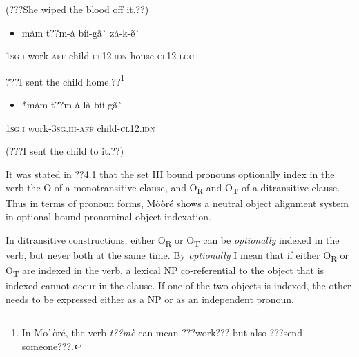 \documentclass[output=paper]{langsci/langscibook}
\begin{document}
{{\begin{styleTranslation}
(???She wiped the blood off it.??)
\end{styleTranslation}

\begin{itemize}
\item \begin{styleNumberedEX}
\label{bkm:Ref424201799}m\`{a}m    t??m-\`{a}    b\'{i}\'{i}-g\~{a}\`{ }      z\'{a}-k-\~{e}\`{ }
\end{styleNumberedEX}\end{itemize}
\begin{styleGloss}
\textsc{1sg.i  }  work-\textsc{aff}  child-\textsc{cl12.idn}  house-\textsc{cl12-loc}
\end{styleGloss}

\begin{styleTranslation}
???I sent the child home.??\footnote{ In Mo\`{ }\`{o}r\'{e}, the verb \textit{t??m\`{e}} can mean ???work??? but also ???send someone???. }
\end{styleTranslation}

\begin{itemize}
\item \begin{styleNumberedEX}
\label{bkm:Ref424201839}*m\`{a}m  t??m-\`{a}-l\`{a}      b\'{i}\'{i}-g\~{a}\`{ }
\end{styleNumberedEX}\end{itemize}
\begin{styleGloss}
\textsc{1sg.i  }  work-\textsc{3sg.iii-aff}    child-\textsc{cl12.idn}
\end{styleGloss}

\begin{styleTranslation}
(???I sent the child to it.??)
\end{styleTranslation}

It was stated in ??4.1 that the set III bound pronouns optionally index in the verb the O of a monotransitive clause, and O\textsubscript{R} and O\textsubscript{T }of a ditransitive clause. Thus in terms of pronoun forms, M\`{o}\`{o}r\'{e} shows a neutral object alignment system in optional bound pronominal object indexation.  

In ditransitive constructions, either O\textsubscript{R} or O\textsubscript{T} can be \textit{optionally} indexed in the verb, but never both at the same time. By \textit{optionally} I mean that if either O\textsubscript{R} or O\textsubscript{T} are indexed in the verb, a lexical NP co-referential to the object that is indexed cannot occur in the clause. If one of the two objects is indexed, the other needs to be expressed either as a NP or as an independent pronoun. 

}}
\end{document}

